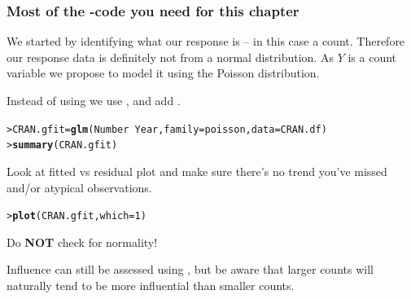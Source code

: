 \documentclass{beamer}\usepackage[]{graphicx}\usepackage[]{xcolor}
\makeatletter
\newcommand{\hlnum}[1]{\textcolor[rgb]{0.686,0.059,0.569}{#1}}%
\newcommand{\hlopt}[1]{\textcolor[rgb]{0,0,0}{#1}}%
\newcommand{\hlstd}[1]{\textcolor[rgb]{0.345,0.345,0.345}{#1}}%
\newcommand{\hlkwb}[1]{\textcolor[rgb]{0.69,0.353,0.396}{#1}}%
\newcommand{\hlkwc}[1]{\textcolor[rgb]{0.333,0.667,0.333}{#1}}%
\newcommand{\hlkwd}[1]{\textcolor[rgb]{0.737,0.353,0.396}{\textbf{#1}}}%
\newenvironment{kframe}{%
 \def\at@end@of@kframe{}%
 \ifinner\ifhmode%
  \def\at@end@of@kframe{\end{minipage}}%
  \begin{minipage}{\columnwidth}%
 \fi\fi%
 \def\FrameCommand##1{\hskip\@totalleftmargin \hskip-\fboxsep
 \colorbox{shadecolor}{##1}\hskip-\fboxsep
     \hskip-\linewidth \hskip-\@totalleftmargin \hskip\columnwidth}%
 \MakeFramed {\advance\hsize-\width
   \@totalleftmargin\z@ \linewidth\hsize
   \@setminipage}}%
 {\par\unskip\endMakeFramed%
 \at@end@of@kframe}
\newenvironment{knitrout}{}{} %
\makeatother
\begin{document}
\begin{frame}[fragile]
\frametitle{Most of the -code you need for this chapter}
We started by identifying what our response is -- in this case a count. Therefore our response data is definitely not from a normal distribution. As $Y$ is a count variable we propose to model it using the Poisson distribution.
\bigskip

Instead of using  we use , and add .

\begin{knitrout}\scriptsize
{}\color{fgcolor}\begin{kframe}
\begin{alltt}
\hlstd{> }\hlstd{CRAN.gfit}\hlkwb{=} \hlkwd{glm}\hlstd{(Number}\hlopt{~}\hlstd{Year,}\hlkwc{family}\hlstd{=poisson,}\hlkwc{data}\hlstd{=CRAN.df)}
\hlstd{> }\hlkwd{summary}\hlstd{(CRAN.gfit)}
\end{alltt}
\end{kframe}
\end{knitrout}

Look at  fitted vs residual plot and make sure there's no trend you've missed and/or atypical observations.

\begin{knitrout}\scriptsize
{}\color{fgcolor}\begin{kframe}
\begin{alltt}
\hlstd{> }\hlkwd{plot}\hlstd{(CRAN.gfit,} \hlkwc{which} \hlstd{=} \hlnum{1}\hlstd{)}
\end{alltt}
\end{kframe}
\end{knitrout}

Do {\bf NOT} check for normality!

Influence can still be assessed using , but be aware that larger counts will naturally tend to be more influential than smaller counts.
\end{frame}
\end{document}
